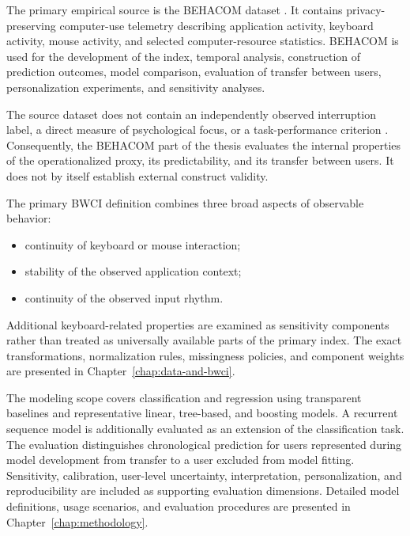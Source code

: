 The primary empirical source is the BEHACOM dataset \parencite{sanchez2020behacom}. It contains privacy-preserving computer-use telemetry describing application activity, keyboard activity, mouse activity, and selected computer-resource statistics. BEHACOM is used for the development of the index, temporal analysis, construction of prediction outcomes, model comparison, evaluation of transfer between users, personalization experiments, and sensitivity analyses.

The source dataset does not contain an independently observed interruption label, a direct measure of psychological focus, or a task-performance criterion \parencite{sanchez2020behacom}. Consequently, the BEHACOM part of the thesis evaluates the internal properties of the operationalized proxy, its predictability, and its transfer between users. It does not by itself establish external construct validity.

The primary BWCI definition combines three broad aspects of observable behavior:

\begin{itemize}
    \item continuity of keyboard or mouse interaction;
    \item stability of the observed application context;
    \item continuity of the observed input rhythm.
\end{itemize}

Additional keyboard-related properties are examined as sensitivity components rather than treated as universally available parts of the primary index. The exact transformations, normalization rules, missingness policies, and component weights are presented in Chapter~\ref{chap:data-and-bwci}.

The modeling scope covers classification and regression using transparent baselines and representative linear, tree-based, and boosting models. A recurrent sequence model is additionally evaluated as an extension of the classification task. The evaluation distinguishes chronological prediction for users represented during model development from transfer to a user excluded from model fitting. Sensitivity, calibration, user-level uncertainty, interpretation, personalization, and reproducibility are included as supporting evaluation dimensions. Detailed model definitions, usage scenarios, and evaluation procedures are presented in Chapter~\ref{chap:methodology}.

